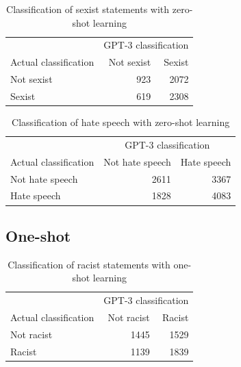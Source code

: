\documentclass[12pt,]{article}
\begin{document}
\begin{table}[!h]

\caption{\label{tab:zeroshot-sexism}Classification of sexist statements with zero-shot learning}
\centering
\fontsize{8}{10}\selectfont
\begin{tabular}[t]{lrr}
\toprule
\multicolumn{1}{c}{ } & \multicolumn{2}{c}{GPT-3 classification} \\
\cmidrule(l{3pt}r{3pt}){2-3}
Actual classification & Not sexist & Sexist\\
\midrule
Not sexist & 923 & 2072\\
Sexist & 619 & 2308\\
\bottomrule
\end{tabular}
\end{table}

\begin{table}[!h]

\caption{\label{tab:zeroshot-hate}Classification of hate speech with zero-shot learning}
\centering
\fontsize{8}{10}\selectfont
\begin{tabular}[t]{lrr}
\toprule
\multicolumn{1}{c}{ } & \multicolumn{2}{c}{GPT-3 classification} \\
\cmidrule(l{3pt}r{3pt}){2-3}
Actual classification & Not hate speech & Hate speech\\
\midrule
Not hate speech & 2611 & 3367\\
Hate speech & 1828 & 4083\\
\bottomrule
\end{tabular}
\end{table}

\newpage

\hypertarget{appendixboneshot}{%
\subsection{One-shot}\label{appendixboneshot}}

\begin{table}[!h]

\caption{\label{tab:oneshot-racism}Classification of racist statements with one-shot learning}
\centering
\fontsize{8}{10}\selectfont
\begin{tabular}[t]{lrr}
\toprule
\multicolumn{1}{c}{ } & \multicolumn{2}{c}{GPT-3 classification} \\
\cmidrule(l{3pt}r{3pt}){2-3}
Actual classification & Not racist & Racist\\
\midrule
Not racist & 1445 & 1529\\
Racist & 1139 & 1839\\
\bottomrule
\end{tabular}
\end{table}
\end{document}
